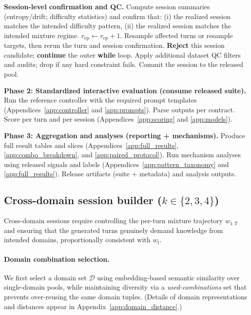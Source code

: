 \begin{algorithm}[p]
\begin{algorithmic}[1]
  \Statex \textbf{Session-level confirmation and QC.}
  \State Compute session summaries (entropy/drift; difficulty statistics) and confirm that: (i) the realized session matches the intended difficulty pattern, (ii) the realized session matches the intended mixture regime.
    \State $r_{\mathrm{ep}}\leftarrow r_{\mathrm{ep}}+1$.
    \State Resample affected turns or resample targets, then rerun the
    turn and session confirmation.
  \EndWhile
    \State \textbf{Reject} this session candidate; \textbf{continue} the outer \textbf{while} loop.
  \EndIf
  \State Apply additional dataset QC filters and audits; drop if any hard constraint fails.
  \State Commit the session to the released pool.
\EndWhile

\Statex \textbf{Phase 2: Standardized interactive evaluation (consume released suite).}
    \State Run the reference controller with the required prompt templates (Appendices~\ref{app:controller} and \ref{app:prompts}).
    \State Parse outputs per contract.
    \State Score per turn and per session (Appendices~\ref{app:scoring} and \ref{app:models}).
  \EndFor
\EndFor

\Statex \textbf{Phase 3: Aggregation and analyses (reporting + mechanisms).}
\State Produce full result tables and slices (Appendices~\ref{app:full_results}, \ref{app:combo_breakdown}, and \ref{app:paired_protocol}).
\State Run mechanism analyses using released signals and labels (Appendices~\ref{app:pattern_taxonomy} and \ref{app:full_results}).
\State \Return Release artifacts (suite + metadata) and analysis outputs.
\end{algorithmic}
\end{algorithm}

\subsection{Cross-domain session builder ($k\in\{2,3,4\}$)}
\label{app:cross_domain_builder}

Cross-domain sessions require controlling the per-turn mixture trajectory $w_{1:T}$ and ensuring that the generated turns genuinely demand knowledge from intended domains, proportionally consistent with $w_t$.

\paragraph{Domain combination selection.}
We first select a domain set $\mathcal{D}$ using embedding-based semantic similarity over single-domain pools, while maintaining diversity via a \emph{used-combinations} set that prevents over-reusing the same domain tuples. (Details of domain representations and distances appear in Appendix~\ref{app:domain_distance}.)

